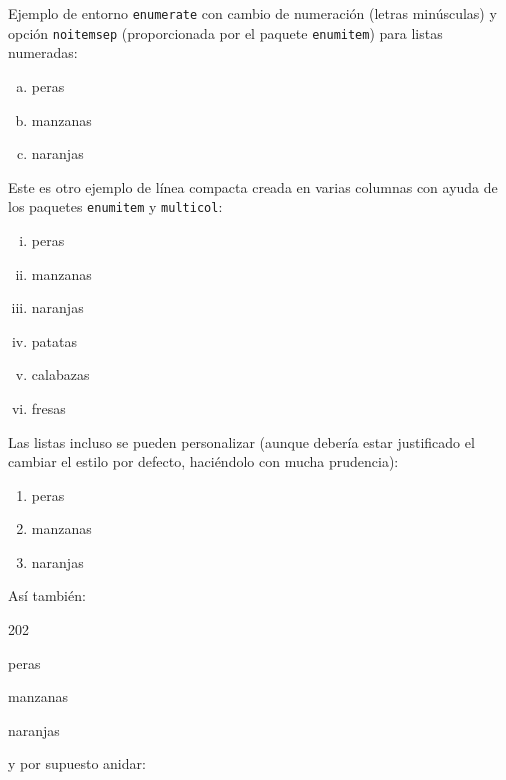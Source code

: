 \noindent Ejemplo de entorno {\tt enumerate} con cambio de numeración (letras minúsculas) y opción \texttt{noitemsep} (proporcionada por el paquete \texttt{enumitem}) para listas numeradas:

\begin{enumerate}[a.-,noitemsep]
	\item peras
	\item manzanas
	\item naranjas
\end{enumerate}

\noindent Este es otro ejemplo de línea compacta creada en varias columnas con ayuda de los paquetes \texttt{enumitem} y \texttt{multicol}:
\begin{multicols}{2} %
	\begin{enumerate}[i.,noitemsep]
		\item peras
		\item manzanas
		\item naranjas
		\item patatas
		\item calabazas
		\item fresas
	\end{enumerate}
\end{multicols}


\noindent Las listas incluso se pueden personalizar (aunque debería estar justificado el cambiar el estilo por defecto, haciéndolo con mucha prudencia):

\begin{enumerate} %
	\item peras
	\item[\ding{55}] manzanas
	\item naranjas
\end{enumerate}


\noindent Así también:

\begin{dingautolist}{202} %
	\item peras
	\item manzanas
	\item naranjas
\end{dingautolist}


\noindent y por supuesto anidar:

